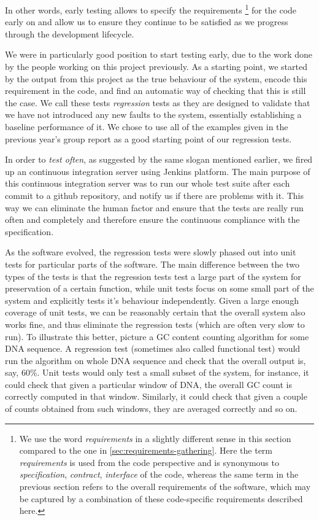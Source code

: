 In other words, early testing allows to specify the requirements
    \footnote{We use the word \emph{requirements} in a slightly different sense in this section compared to the one in \autoref{sec:requirements-gathering}. 
    Here the term \emph{requirements} is used from the code perspective and is synonymous to \emph{specification}, \emph{contract}, \emph{interface} of the code, whereas the same term in the previous section refers to the overall requirements of the software, which may be captured by a combination of these code-specific requirements described here.} 
for the code early on and allow us to ensure they continue to be satisfied as we progress through the development lifecycle. 


We were in particularly good position to start testing early, due to the work done by the people working on this project previously. 
As a starting point, we started by the output from this project as the true behaviour of the system, encode this requirement in the code, and find an automatic way of checking that this is still the case. 
We call these tests \emph{regression} tests as they are designed to validate that we have not introduced any new faults to the system,
essentially establishing a baseline performance of it.
We chose to use all of the examples given in the previous year's group report as a good starting point of our regression tests.

In order to \emph{test often}, as suggested by the same slogan mentioned earlier, we fired up an continuous integration server using Jenkins platform\cite{_jenkins_????}. The main purpose of this continuous integration server was to run our whole test suite after each commit to a github repository, and notify us if there are problems with it. 
This way we can eliminate the human factor and ensure that the tests are really run often and completely and therefore ensure the continuous compliance with the specification.

As the software evolved, the regression tests were slowly phased out into unit tests for particular parts of the software. The main difference between the two types of the tests is that the regression tests test a large part of the system for preservation of a certain function, while unit tests focus on some small part of the system and explicitly tests it's behaviour independently. Given a large enough coverage of unit tests, we can be reasonably certain that the overall system also works fine, and thus eliminate the regression tests (which are often very slow to run). To illustrate this better, picture a GC content counting algorithm for some DNA sequence. 
A regression test (sometimes also called functional test) would run the algorithm on whole DNA sequence and check that the overall output is, say, 60\%. 
Unit tests would only test a small subset of the system, for instance, it could check that given a particular window of DNA, the overall GC count is correctly computed in that window. Similarly, it could check that given a couple of counts obtained from such windows, they are averaged correctly and so on. 

